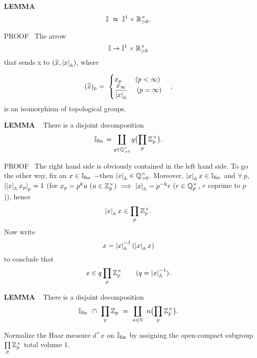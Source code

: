 \vspace{0.1cm}


\begin{x}{\small\bf LEMMA} \ %
\[
\mathbb{I} \ \thickapprox \ \mathbb{I}^1 \times  \mathbb{R}_{>0}^\times.
\]

\vspace{0.1cm}

PROOF \  
The arrow
\[
\mathbb{I} \rightarrow \mathbb{I}^1 \times  \mathbb{R}_{>0}^\times
\]
that sends x to $(\widetilde{x}, \left\vert x\right\vert_{\mathbb{A}})$, where 

\[(\widetilde{x})_p = \ 
\begin{cases}
x_p \quad \quad (p < \infty)\\
\ds\frac{x_\infty}{\abs{x}_\A} \  \quad (p = \infty)
\end{cases}
,\]
is an isomorphism of topological groups.
\end{x}

\vspace{0.1cm}

\begin{x}{\small\bf LEMMA} \ %
There is a disjoint decomposition
\[
\mathbb{I}_{\text{fin}\hspace{0.05cm}} = \coprod_{q \in \mathbb{Q}_{>0}^\times} q\bigl(\prod\limits_p \mathbb{Z}_p^\times\bigr).
\]

\vspace{0.1cm}

PROOF \  The right hand side is obviously contained in the left hand side.  
To go the other way, fix an $x \in \mathbb{I}_{\text{fin}\hspace{0.05cm}}$ $-$then $\left\vert x\right\vert_{\mathbb{A}} \in  \mathbb{Q}_{>0}^\times$.  
Moreover, 
$\left\vert x\right\vert_{\mathbb{A}} x \in \mathbb{I}_{\text{fin}\hspace{0.05cm}}$ and $\forall \ p$, $\left\vert \left\vert x\right\vert_{\mathbb{A}} x_p\right\vert_p = 1$ 
(for $x_p = p^ku \ (u \in \mathbb{Z}_p^\times) \implies \left\vert x\right\vert_{\mathbb{A}} = p^{-k}r  \ (r \in \mathbb{Q}_p^\times$, $r$ coprime to $p$)), hence
\[
\left\vert x\right\vert_{\mathbb{A}} x \in \prod\limits_p \mathbb{Z}_p^\times.
\]
Now write
\[
x = \left\vert x\right\vert_{\mathbb{A}}^{-1} (\left\vert x\right\vert_{\mathbb{A}} x)
\]
to conclude that
\[
x \in q \prod\limits_p \mathbb{Z}_p^\times \qquad (q = \left\vert x\right\vert_{\mathbb{A}}^{-1} ).
\]
\end{x}

\vspace{0.1cm}


\begin{x}{\small\bf LEMMA} \ %
There is a disjoint decomposition
\[
\I_{\fin} \ \cap \ \prod\limits_p \Z_p \ = \ \coprod_{n \in \N} \ n\bigl(\prod\limits_p \Z_p^\times\bigr).
\]
\end{x}

\vspace{0.1cm}


Normalize the Haar measure $d^\times x$ on $\mathbb{I}_{\text{fin}\hspace{0.05cm}}$ by assigning the open-compact subgroup $\prod\limits_p \mathbb{Z}_p^\times$ total volume 1.
\vspace{0.2cm}

